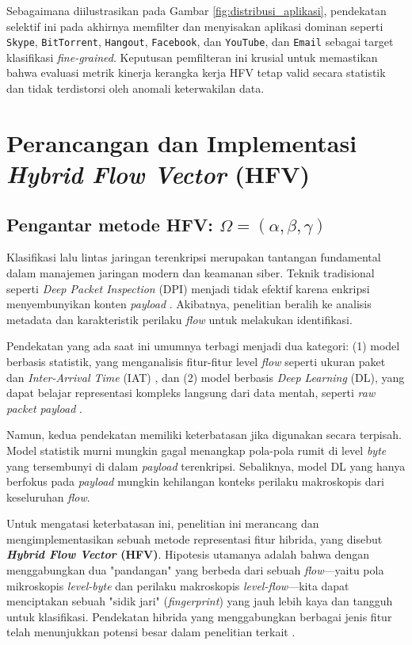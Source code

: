 Sebagaimana diilustrasikan pada Gambar \ref{fig:distribusi_aplikasi}, pendekatan selektif ini pada akhirnya memfilter dan menyisakan aplikasi dominan seperti \texttt{Skype}, \texttt{BitTorrent}, \texttt{Hangout}, \texttt{Facebook}, dan \texttt{YouTube}, dan \texttt{Email} sebagai target klasifikasi \textit{fine-grained}. Keputusan pemfilteran ini krusial untuk memastikan bahwa evaluasi metrik kinerja kerangka kerja HFV tetap valid secara statistik dan tidak terdistorsi oleh anomali keterwakilan data.

\section{Perancangan dan Implementasi \textit{Hybrid Flow Vector} (HFV)}

\subsection{Pengantar metode HFV: $\Omega = (\alpha, \beta, \gamma)$}
\label{subsec:kerangka_hfv}

Klasifikasi lalu lintas jaringan terenkripsi merupakan tantangan fundamental dalam manajemen jaringan modern dan keamanan siber. Teknik tradisional seperti \textit{Deep Packet Inspection} (DPI) menjadi tidak efektif karena enkripsi menyembunyikan konten \textit{payload} \citep{razooqi2025vpn}. Akibatnya, penelitian beralih ke analisis metadata dan karakteristik perilaku \textit{flow} untuk melakukan identifikasi.

Pendekatan yang ada saat ini umumnya terbagi menjadi dua kategori: (1) model berbasis statistik, yang menganalisis fitur-fitur level \textit{flow} seperti ukuran paket dan \textit{Inter-Arrival Time} (IAT) \citep{DraperGil2016}, dan (2) model berbasis \textit{Deep Learning} (DL), yang dapat belajar representasi kompleks langsung dari data mentah, seperti \textit{raw packet payload} \citep{Lotfollahi2019}.

Namun, kedua pendekatan memiliki keterbatasan jika digunakan secara terpisah. Model statistik murni mungkin gagal menangkap pola-pola rumit di level \textit{byte} yang tersembunyi di dalam \textit{payload} terenkripsi. Sebaliknya, model DL yang hanya berfokus pada \textit{payload} mungkin kehilangan konteks perilaku makroskopis dari keseluruhan \textit{flow}.

Untuk mengatasi keterbatasan ini, penelitian ini merancang dan mengimplementasikan sebuah metode representasi fitur hibrida, yang disebut \textbf{\textit{Hybrid Flow Vector} (HFV)}. Hipotesis utamanya adalah bahwa dengan menggabungkan dua "pandangan" yang berbeda dari sebuah \textit{flow}---yaitu pola mikroskopis \textit{level-byte} dan perilaku makroskopis \textit{level-flow}---kita dapat menciptakan sebuah "sidik jari" (\textit{fingerprint}) yang jauh lebih kaya dan tangguh untuk klasifikasi. Pendekatan hibrida yang menggabungkan berbagai jenis fitur telah menunjukkan potensi besar dalam penelitian terkait \citep{jorgensen2023extensible}.

